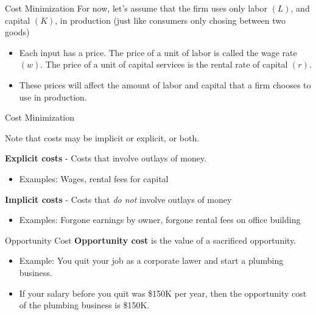 \documentclass[11pt,t]{beamer}
\begin{document}
\begin{frame}{Cost Minimization}
  For now, let's assume that the firm uses only labor $(L)$, and capital $(K)$, in production (just like consumers only chosing between two goods)

  \bigskip
  \begin{itemize}
    \item Each input has a price. The price of a unit of labor is called the wage rate $(w)$. The price of a unit of capital services is the rental rate of capital $(r)$.

    \item These prices will affect the amount of labor and capital that a firm chooses to use in production.
  \end{itemize}
\end{frame}

\begin{frame}{Cost Minimization}
  \bigskip

  Note that costs may be implicit or explicit, or both.

  \bigskip
  \textbf{Explicit costs} - Costs that involve outlays of money.

  \begin{itemize}
    \item Examples: Wages, rental fees for capital
  \end{itemize}

  \bigskip
  \textbf{Implicit costs} - Costs that \textit{do not} involve outlays of money

  \begin{itemize}
    \item Examples: Forgone earnings by owner, forgone rental fees on office building
  \end{itemize}
\end{frame}

\begin{frame}{Opportunity Cost}
  \textbf{Opportunity cost} is the value of a sacrificed opportunity.

  \bigskip
  \begin{itemize}
    \item Example: You quit your job as a corporate lawer and start a plumbing business.
  
    \item If your salary before you quit was \$150K per year, then the opportunity cost of the plumbing business is \$150K.
  \end{itemize}
\end{frame}
\end{document}
